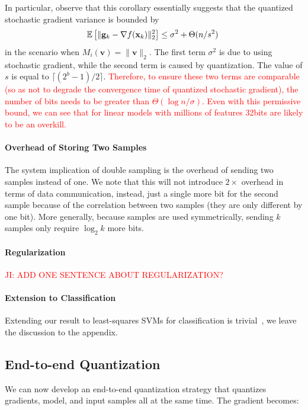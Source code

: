\documentclass{article}
\renewcommand{\vec}[1]{\mathbf{#1}}
\def\g{{\bf g}}
\def\x{{\bf x}}
\def\E{\mathbb{E}}
\begin{document}
In particular, observe that this corollary essentially suggests that the quantized stochastic gradient variance is bounded by
\[
\E \left[ \| \g_k - \nabla f(\x_k) \|_2^2 \right] \leq \sigma^2 + \Theta(n/s^2) \;
\]
in the scenario when $M_i (\vec{v}) = \| \vec{v} \|_2 $.
The first term $\sigma^2$ is due to using stochastic gradient, while the second term is caused by quantization. The value of $s$ is equal to  $\lceil(2^b - 1) / 2\rceil$. \textcolor{red}{Therefore, to ensure these two terms are comparable (so as not to degrade the convergence time of quantized stochastic gradient), the number of bits needs to be greater than $\Theta(\log n / \sigma)$. Even with this permissive
bound, we can see that for linear models with millions
of features 32bits are likely to be an overkill.}

\paragraph*{Overhead of Storing Two Samples}
The system implication of double sampling is the overhead of sending
two samples instead of one. We note that this will not introduce $2\times$
overhead in terms of data communication, instead, just a single more bit
for the second sample because of the correlation between two samples (they 
are only different by one bit). More generally, because samples
are used symmetrically, sending $k$ samples only require $\log_2 k$ more bits.


\paragraph*{Regularization}

\textcolor{red}{JI: ADD ONE SENTENCE ABOUT REGULARIZATION?}

\paragraph*{Extension to Classification}

Extending our result to least-squares SVMs for classification
is trivial~\cite{SvmVsLssvm}, we leave the discussion to the
appendix.


\subsection{End-to-end Quantization}

We can now develop an end-to-end quantization strategy that
quantizes gradients, model, and input samples all 
at the same time. The gradient becomes:
\end{document}

